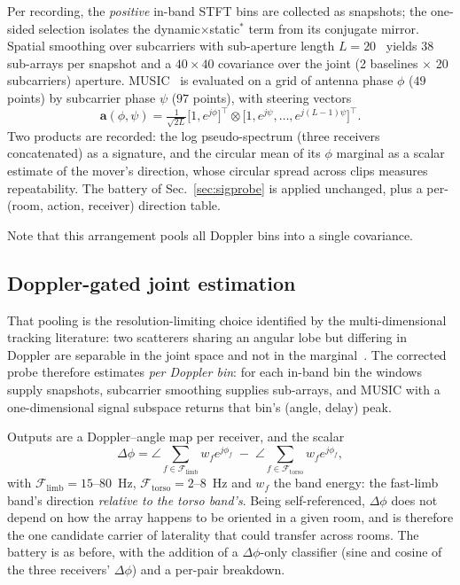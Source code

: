\documentclass[conference]{IEEEtran}
\begin{document}
Per recording, the \emph{positive} in-band STFT bins are collected as
snapshots; the one-sided selection isolates the dynamic$\times$static$^*$ term
from its conjugate mirror. Spatial smoothing over subcarriers with sub-aperture
length $L = 20$~\cite{shan1985smoothing} yields $38$ sub-arrays per snapshot
and a $40 \times 40$ covariance over the joint (2 baselines $\times$ 20
subcarriers) aperture. MUSIC~\cite{schmidt1986music} is evaluated on a grid of
antenna phase $\phi$ ($49$ points) by subcarrier phase $\psi$ ($97$ points),
with steering vectors
\begin{equation}
\mathbf{a}(\phi,\psi) = \tfrac{1}{\sqrt{2L}}
\big[1, e^{j\phi}\big]^{\!\top} \!\otimes\!
\big[1, e^{j\psi}, \dots, e^{j(L-1)\psi}\big]^{\!\top}.
\label{eq:steer}
\end{equation}
Two products are recorded: the log pseudo-spectrum (three receivers
concatenated) as a signature, and the circular mean of its $\phi$ marginal as a
scalar estimate of the mover's direction, whose circular spread across clips
measures repeatability. The battery of Sec.~\ref{sec:sigprobe} is applied
unchanged, plus a per-(room, action, receiver) direction table.

Note that this arrangement pools all Doppler bins into a single covariance.

\subsection{Doppler-gated joint estimation}
\label{sec:dopplergated}

That pooling is the resolution-limiting choice identified by the
multi-dimensional tracking literature: two scatterers sharing an angular lobe
but differing in Doppler are separable in the joint space and not in the
marginal~\cite{xie2019mdtrack,qian2018widar2,li2016dynamicmusic}. The corrected
probe therefore estimates \emph{per Doppler bin}: for each in-band bin the
windows supply snapshots, subcarrier smoothing supplies sub-arrays, and MUSIC
with a one-dimensional signal subspace returns that bin's (angle, delay) peak.

Outputs are a Doppler--angle map per receiver, and the scalar
\begin{equation}
\Delta\phi = \angle\!\!\!\sum_{f \in \mathcal{F}_{\text{limb}}}\!\! w_f e^{j\phi_f}
\;-\; \angle\!\!\!\sum_{f \in \mathcal{F}_{\text{torso}}}\!\! w_f e^{j\phi_f},
\label{eq:dphi}
\end{equation}
with $\mathcal{F}_{\text{limb}} = 15$--\SI{80}{\hertz},
$\mathcal{F}_{\text{torso}} = 2$--\SI{8}{\hertz} and $w_f$ the band energy:
the fast-limb band's direction \emph{relative to the torso band's}. Being
self-referenced, $\Delta\phi$ does not depend on how the array happens to be
oriented in a given room, and is therefore the one candidate carrier of
laterality that could transfer across rooms. The battery is as before, with the
addition of a $\Delta\phi$-only classifier (sine and cosine of the three
receivers' $\Delta\phi$) and a per-pair breakdown.
\end{document}
